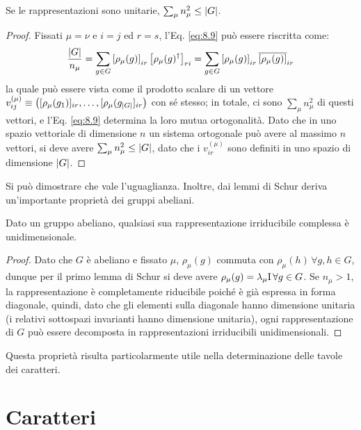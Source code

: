 \begin{corollary}\label{cond-n-mu}
	Se le rappresentazioni sono unitarie, $ \sum_{\mu} n_{\mu}^2 \le \left\lvert G\right\rvert $.
\end{corollary}
\begin{proof}
	Fissati $ \mu = \nu $ e $ i = j $ ed $ r = s $, l'Eq. \ref{eq:8.9} può essere riscritta come:
	\begin{equation*}
		\frac{\left\lvert G\right\rvert}{n_{\mu}} = \sum_{g \in G} \left[ \rho_{\mu}(g) \right]_{ir} \left[ \rho_{\mu}(g)^{\dagger} \right]_{ri} = \sum_{g \in G} \left[ \rho_{\mu}(g) \right]_{ir} \overline{\left[ \rho_{\mu}(g) \right]}_{ir}
	\end{equation*}
	la quale può essere vista come il prodotto scalare di un vettore $ v^{(\mu)}_{ij} \equiv \left( [\rho_{\mu}(g_1)]_{ir}, \dots, [\rho_{\mu}(g_{\left\lvert G\right\rvert}]_{ir} \right) $ con sé stesso; in totale, ci sono $ \sum_{\mu} n_{\mu}^2 $ di questi vettori, e l'Eq. \ref{eq:8.9} determina la loro mutua ortogonalità. Dato che in uno spazio vettoriale di dimensione $ n $ un sistema ortogonale può avere al massimo $ n $ vettori, si deve avere $ \sum_{\mu} n_{\mu}^2 \le \left\lvert G\right\rvert $, dato che i $ v^{(\mu)}_{ir} $ sono definiti in uno spazio di dimensione $ \left\lvert G\right\rvert $.
\end{proof}

Si può dimostrare che vale l'uguaglianza. Inoltre, dai lemmi di Schur deriva un'importante proprietà dei gruppi abeliani.

\begin{proposition}\label{irrep-unidim}
	Dato un gruppo abeliano, qualsiasi sua rappresentazione irriducibile complessa è unidimensionale.
\end{proposition}
\begin{proof}
	Dato che $ G $ è abeliano e fissato $ \mu $, $ \rho_{\mu}(g) $ commuta con $ \rho_{\mu}(h) \,\forall g,h \in G $, dunque per il primo lemma di Schur si deve avere $ \rho_{\mu}(g) = \lambda_{\mu} \mathrm{I} \,\forall g \in G $. Se $ n_{\mu} > 1 $, la rappresentazione è completamente riducibile poiché è già espressa in forma diagonale, quindi, dato che gli elementi sulla diagonale hanno dimensione unitaria (i relativi sottospazi invarianti hanno dimensione unitaria), ogni rappresentazione di $ G $ può essere decomposta in rappresentazioni irriducibili unidimensionali.
\end{proof}

Questa proprietà risulta particolarmente utile nella determinazione delle tavole dei caratteri.

\section{Caratteri}
\label{sec-char}

